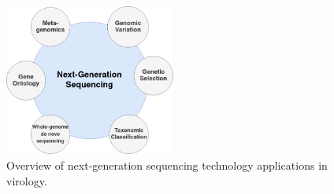 \begin{figure}
	\centering
	\includegraphics[width=0.5\textwidth]{media/2-ngs.png}
	\caption{Overview of next-generation sequencing technology applications in virology.}
	\label{fig:2-ngs}
\end{figure} 

